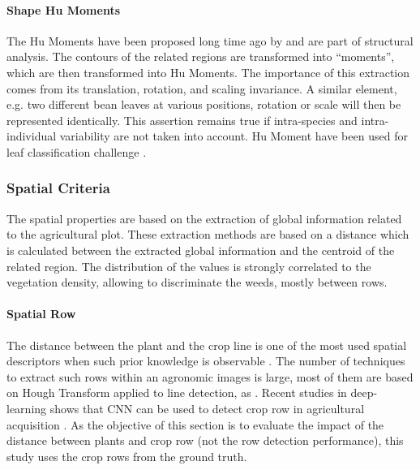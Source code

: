 \documentclass[../thesis.tex]{subfiles}
\begin{document}
    \paragraph{Shape Hu Moments} The Hu Moments have been proposed long time ago by \cite{hu1962visual} and are part of structural analysis. The contours of the related regions are transformed into ``moments'', which are then transformed into Hu Moments. The importance of this extraction comes from its translation, rotation, and scaling invariance. A similar element, e.g. two different bean leaves at various positions, rotation or scale will then be represented identically. This assertion remains true if intra-species and intra-individual variability are not taken into account. Hu Moment have been used for leaf classification challenge \cite{rhouma2017moment}.
    
    
    \subsubsection{Spatial Criteria}
    
    The spatial properties are based on the extraction of global information related to the agricultural plot. These extraction methods are based on a distance which is calculated between the extracted global information and the centroid of the related region. The distribution of the values is strongly correlated to the vegetation density, allowing to discriminate the weeds, mostly between rows.
    
    \paragraph{Spatial Row} The distance between the plant and the crop line is one of the most used spatial descriptors when such prior knowledge is observable \cite{rs10050761, Koot891024465110, DBLP:journals/corr/abs-1805-12395}. The number of techniques to extract such rows within an agronomic images is large, most of them are based on Hough Transform applied to line detection, as \cite{rs10050761}. Recent studies in deep-learning shows that CNN can be used to detect crop row in agricultural acquisition \cite{bah2019crownet}. As the objective of this section is to evaluate the impact of the distance between plants and crop row (not the row detection performance), this study uses the crop rows from the ground truth.
    
\end{document}
